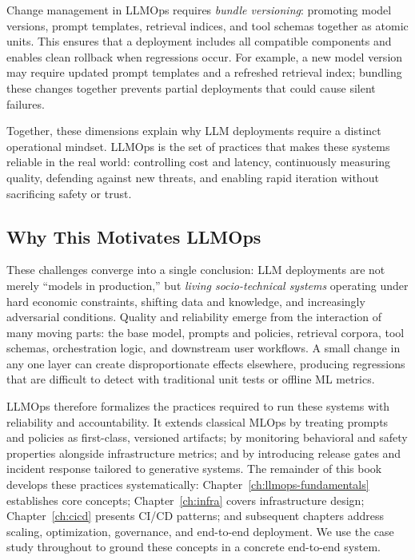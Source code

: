 Change management in LLMOps requires \emph{bundle versioning}: promoting model versions, prompt templates, retrieval indices, and tool schemas together as atomic units. This ensures that a deployment includes all compatible components and enables clean rollback when regressions occur. For example, a new model version may require updated prompt templates and a refreshed retrieval index; bundling these changes together prevents partial deployments that could cause silent failures.

Together, these dimensions explain why LLM deployments require a distinct operational mindset. LLMOps is the set of practices that makes these systems reliable in the real world: controlling cost and latency, continuously measuring quality, defending against new threats, and enabling rapid iteration without sacrificing safety or trust.

\subsection{Why This Motivates LLMOps}
These challenges converge into a single conclusion: LLM deployments are not merely ``models in production,'' but \emph{living socio-technical systems} operating under hard economic constraints, shifting data and knowledge, and increasingly adversarial conditions. Quality and reliability emerge from the interaction of many moving parts: the base model, prompts and policies, retrieval corpora, tool schemas, orchestration logic, and downstream user workflows. A small change in any one layer can create disproportionate effects elsewhere, producing regressions that are difficult to detect with traditional unit tests or offline ML metrics.

LLMOps therefore formalizes the practices required to run these systems with reliability and accountability. It extends classical MLOps by treating prompts and policies as first-class, versioned artifacts; by monitoring behavioral and safety properties alongside infrastructure metrics; and by introducing release gates and incident response tailored to generative systems. The remainder of this book develops these practices systematically: Chapter~\ref{ch:llmops-fundamentals} establishes core concepts; Chapter~\ref{ch:infra} covers infrastructure design; Chapter~\ref{ch:cicd} presents CI/CD patterns; and subsequent chapters address scaling, optimization, governance, and end-to-end deployment. We use the \ishtar{} case study throughout to ground these concepts in a concrete end-to-end system.

